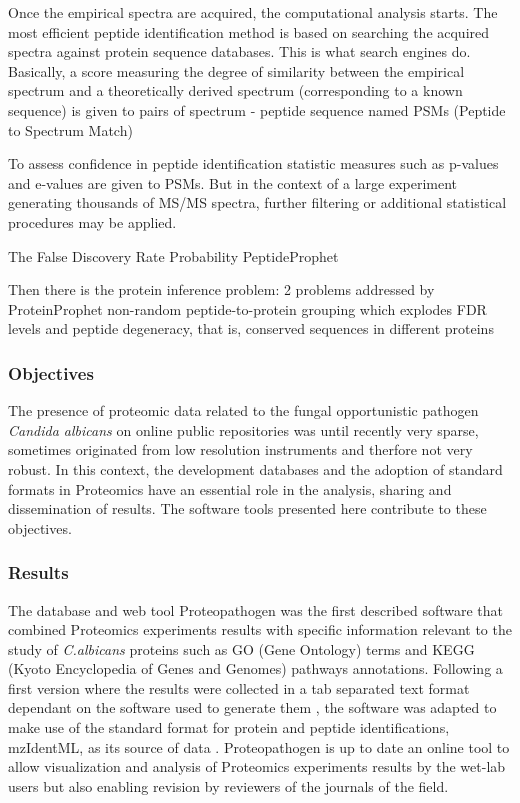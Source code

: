 Once the empirical spectra are acquired, the computational analysis starts.
The most efficient peptide identification method is based on searching 
the acquired spectra against protein sequence databases. This is what
search engines do. Basically, a score measuring the degree of similarity 
between the empirical spectrum and a theoretically derived spectrum (corresponding to a known 
sequence) is given to pairs of spectrum - peptide sequence named PSMs (Peptide to Spectrum Match)

To assess confidence in peptide identification statistic measures such
as p-values and e-values are given to PSMs. But in the context of a large
experiment generating thousands of MS/MS spectra, further filtering or additional
statistical procedures may be applied.

The False Discovery Rate
Probability PeptideProphet

Then there is the protein inference problem: 2 problems
addressed by ProteinProphet non-random peptide-to-protein grouping which explodes FDR levels
and peptide degeneracy, that is, conserved sequences in different proteins


\subsubsection*{Objectives}
The presence of proteomic data related to the fungal opportunistic 
pathogen \textit{Candida albicans} on online public repositories was
until recently very sparse, sometimes originated from low resolution
instruments and therfore not very robust.
In this context, the development databases and the adoption
of standard formats in Proteomics have an essential role in the analysis,
sharing and dissemination of results. The software tools presented here 
contribute to these objectives.

\subsubsection*{Results}
The database and web tool Proteopathogen was the first described software 
that combined Proteomics experiments results with specific information 
relevant to the study of \textit{C.albicans} proteins such as GO (Gene Ontology)
terms and KEGG (Kyoto Encyclopedia of Genes and Genomes) pathways annotations.
Following a first version where the results were collected
in a tab separated text format dependant on the software used to generate 
them \citep{Vialas2009b}, the software was adapted to make use of
the standard format for protein and peptide identifications, mzIdentML, as its source of data
\citep{Vialas2015}. Proteopathogen is up to date an online tool to allow
visualization and analysis of Proteomics experiments results by the wet-lab 
users but also enabling revision by reviewers of the journals of the field.

